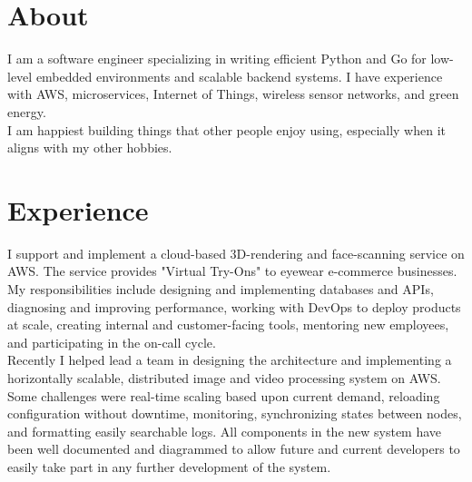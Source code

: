 \documentclass[letterpaper]{deedy-resume} %
\begin{document}
\begin{minipage}[t]{0.33\textwidth}
\sectionspace %


\end{minipage} %
\hfill
%
%
\begin{minipage}[t]{0.66\textwidth} %


\section{About}
I am a software engineer specializing in writing efficient Python and Go for low-level embedded environments and scalable backend systems.
I have experience with AWS, microservices, Internet of Things, wireless sensor networks, and green energy.\\[1em]
I am happiest building things that other people enjoy using, especially when it aligns with my other hobbies.
\sectionspace


\section{Experience}


I support and implement a cloud-based 3D-rendering and face-scanning service on AWS. The service provides "Virtual Try-Ons" to eyewear e-commerce businesses.\\[1em]
My responsibilities include designing and implementing databases and APIs, diagnosing and improving performance, working with DevOps to deploy products at scale, creating internal and customer-facing tools, mentoring new employees, and participating in the on-call cycle.\\[1em]
Recently I helped lead a team in designing the architecture and implementing a horizontally scalable, distributed image and video processing system on AWS.
Some challenges were real-time scaling based upon current demand, reloading configuration without downtime, monitoring, synchronizing states between nodes, and formatting easily searchable logs.
All components in the new system have been well documented and diagrammed to allow future and current developers to easily take part in any further development of the system.
\sectionspace


\end{minipage}
\end{document}
